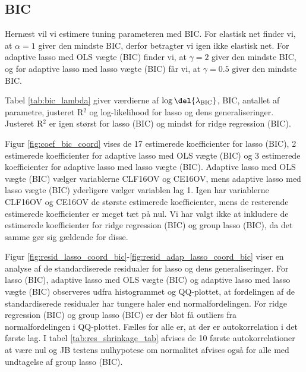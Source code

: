\newpage
\subsection{BIC}
Hernæst vil vi estimere tuning parameteren med BIC.
For elastisk net finder vi, at $\alpha = 1$ giver den mindste BIC, derfor betragter vi igen ikke elastisk net.
For adaptive lasso med OLS vægte (BIC) finder vi, at $\gamma = 2$ giver den mindste BIC, og for adaptive lasso med lasso vægte (BIC) får vi, at $\gamma = 0.5$ giver den mindste BIC. 

Tabel \ref{tab:bic_lambda} giver værdierne af $\log \del{ \lambda_\text{BIC}}$, BIC, antallet af parametre, justeret R$^2$ og log-likelihood for lasso og dens generaliseringer. 
Justeret R$^2$ er igen størst for lasso (BIC) og mindst for ridge regression (BIC).



Figur \ref{fig:coef_bic_coord} vises de 17 estimerede koefficienter for lasso (BIC), 2 estimerede koefficienter for adaptive lasso med OLS vægte (BIC) og 3 estimerede koefficienter for adaptive lasso med lasso vægte (BIC).
Adaptive lasso med OLS vægte (BIC) vælger variablerne \textcolor{blue3}{CLF16OV} og \textcolor{blue3}{CE16OV}, mens adaptive lasso med lasso vægte (BIC) yderligere vælger variablen \textcolor{blue3}{lag 1}. 
Igen har variablerne \textcolor{blue3}{CLF16OV} og \textcolor{blue3}{CE16OV} de største estimerede koefficienter, mens de resterende estimerede koefficienter er meget tæt på nul. 
Vi har valgt ikke at inkludere de estimerede koefficienter for ridge regression (BIC) og group lasso (BIC), da det samme gør sig gældende for disse.


Figur \ref{fig:resid_lasso_coord_bic}-\ref{fig:resid_adap_lasso_coord_bic} viser en analyse af de standardiserede residualer for lasso og dens generaliseringer.
For lasso (BIC), adaptive lasso med OLS vægte (BIC) og adaptive lasso med lasso vægte (BIC) observeres udfra histogrammet og QQ-plottet, at fordelingen af de standardiserede residualer har tungere haler end normalfordelingen.
For ridge regression (BIC) og group lasso (BIC) er der blot få outliers fra normalfordelingen i QQ-plottet.
Fælles for alle er, at der er autokorrelation i det første lag. 
I tabel \ref{tab:res_shrinkage_tab} afvises de 10 første autokorrelationer at være nul og JB testens nulhypotese om normalitet afvises også for alle med undtagelse af group lasso (BIC).

